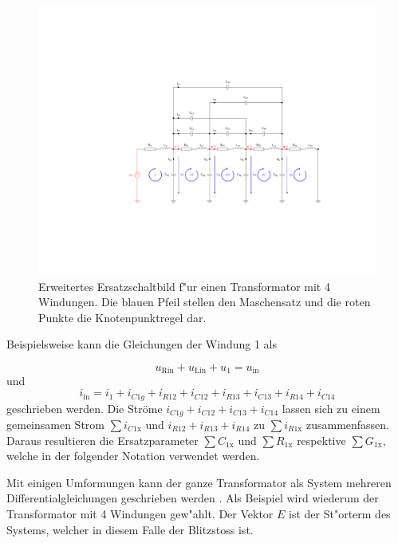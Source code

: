 \begin{refsection}
\begin{figure}
	\centering
	\includegraphics[width=\hsize]{./trafo/images/orig_trafo.pdf}
	\caption[Erweitertes Ersatzschaltbild f"ur einen Transformator mit Maschensatz und Knotenpunkt]{Erweitertes Ersatzschaltbild f"ur einen Transformator mit 4 Windungen. Die blauen Pfeil stellen den Maschensatz und die roten Punkte die Knotenpunktregel dar.}
	\label{trafo:orig}
\end{figure}

Beispielsweise kann die Gleichungen der Windung 1 als 

\begin{equation}
	u_\mathrm{Rin} + u_\mathrm{Lin} + u_1 = u_\mathrm{in}
\end{equation}
und 
\begin{equation}
	i_\mathrm{in} = i_1 + i_{C1g} + i_{R12} + i_{C12} + i_{R13} + i_{C13} + i_{R14} + i_{C14}
\end{equation}
geschrieben werden. Die Ströme $i_{C1g}+ i_{C12} + i_{C13} + i_{C14}$ lassen sich zu einem gemeinsamen Strom $\sum i_{C1\mathrm{x}}$ und $i_{R12} + i_{R13} + i_{R14}$ zu $ \sum i_{R1\mathrm{x}}$ zusammenfassen. Daraus resultieren die Ersatzparameter $\sum C_{1\mathrm{x}}$ und $\sum R_{1\mathrm{x}}$ respektive $\sum G_{1\mathrm{x}}$, welche in der folgender Notation verwendet werden.

Mit einigen Umformungen kann der ganze Transformator als System mehreren Differentialgleichungen geschrieben werden \cite{trafo:SeminarCHR}. Als Beispiel wird wiederum der Transformator mit 4 Windungen gew"ahlt. Der Vektor $E$ ist der St"orterm des Systems, welcher in diesem Falle der Blitzstoss ist.


\end{refsection}
